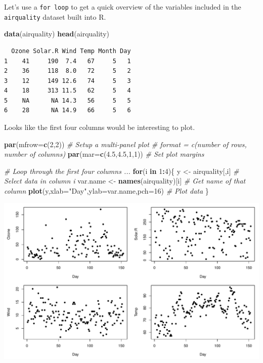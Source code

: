 \documentclass[
]{book}
\newenvironment{Shaded}{\begin{snugshade}}{\end{snugshade}}
\newcommand{\CommentTok}[1]{\textcolor[rgb]{0.56,0.35,0.01}{\textit{#1}}}
\newcommand{\ControlFlowTok}[1]{\textcolor[rgb]{0.13,0.29,0.53}{\textbf{#1}}}
\newcommand{\DataTypeTok}[1]{\textcolor[rgb]{0.13,0.29,0.53}{#1}}
\newcommand{\DecValTok}[1]{\textcolor[rgb]{0.00,0.00,0.81}{#1}}
\newcommand{\FloatTok}[1]{\textcolor[rgb]{0.00,0.00,0.81}{#1}}
\newcommand{\KeywordTok}[1]{\textcolor[rgb]{0.13,0.29,0.53}{\textbf{#1}}}
\newcommand{\NormalTok}[1]{#1}
\newcommand{\OperatorTok}[1]{\textcolor[rgb]{0.81,0.36,0.00}{\textbf{#1}}}
\newcommand{\StringTok}[1]{\textcolor[rgb]{0.31,0.60,0.02}{#1}}
\begin{document}
Let's use a \texttt{for\ loop} to get a quick overview of the variables included in the \texttt{airquality} dataset built into R.

\begin{Shaded}
\begin{Highlighting}[]
\KeywordTok{data}\NormalTok{(airquality)}
\KeywordTok{head}\NormalTok{(airquality)}
\end{Highlighting}
\end{Shaded}

\begin{verbatim}
  Ozone Solar.R Wind Temp Month Day
1    41     190  7.4   67     5   1
2    36     118  8.0   72     5   2
3    12     149 12.6   74     5   3
4    18     313 11.5   62     5   4
5    NA      NA 14.3   56     5   5
6    28      NA 14.9   66     5   6
\end{verbatim}

Looks like the first four columns would be interesting to plot.

\begin{Shaded}
\begin{Highlighting}[]
\KeywordTok{par}\NormalTok{(}\DataTypeTok{mfrow=}\KeywordTok{c}\NormalTok{(}\DecValTok{2}\NormalTok{,}\DecValTok{2}\NormalTok{)) }\CommentTok{# Setup a multi-panel plot # format = c(number of rows, number of columns)}
\KeywordTok{par}\NormalTok{(}\DataTypeTok{mar=}\KeywordTok{c}\NormalTok{(}\FloatTok{4.5}\NormalTok{,}\FloatTok{4.5}\NormalTok{,}\DecValTok{1}\NormalTok{,}\DecValTok{1}\NormalTok{)) }\CommentTok{# Set plot margins}

\CommentTok{# Loop through the first four columns ...}
\ControlFlowTok{for}\NormalTok{(i }\ControlFlowTok{in} \DecValTok{1}\OperatorTok{:}\DecValTok{4}\NormalTok{)\{}
\NormalTok{  y <-}\StringTok{ }\NormalTok{airquality[,i] }\CommentTok{# Select data in column i}
\NormalTok{  var.name <-}\StringTok{ }\KeywordTok{names}\NormalTok{(airquality)[i] }\CommentTok{# Get name of that column}
  \KeywordTok{plot}\NormalTok{(y,}\DataTypeTok{xlab=}\StringTok{"Day"}\NormalTok{,}\DataTypeTok{ylab=}\NormalTok{var.name,}\DataTypeTok{pch=}\DecValTok{16}\NormalTok{) }\CommentTok{# Plot data}
\NormalTok{\}}
\end{Highlighting}
\end{Shaded}

\includegraphics{figures/unnamed-chunk-250-1.pdf}
\end{document}
